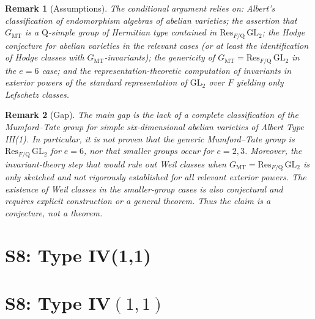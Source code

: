 \documentclass{article}
\newcommand{\mathbb}[1]{\mathrm{#1}}
\newtheorem{remark}{Remark}
\begin{document}
\begin{remark}[Assumptions]
The conditional argument relies on: Albert's classification of endomorphism algebras of abelian varieties; the assertion that $G_{\mathrm{MT}}$ is a $\mathbb{Q}$-simple group of Hermitian type contained in $\mathrm{Res}_{F/\mathbb{Q}}\,\mathrm{GL}_2$; the Hodge conjecture for abelian varieties in the relevant cases (or at least the identification of Hodge classes with $G_{\mathrm{MT}}$-invariants); the genericity of $G_{\mathrm{MT}} = \mathrm{Res}_{F/\mathbb{Q}}\,\mathrm{GL}_2$ in the $e = 6$ case; and the representation-theoretic computation of invariants in exterior powers of the standard representation of $\mathrm{GL}_2$ over $F$ yielding only Lefschetz classes.
\end{remark}

\begin{remark}[Gap]
The main gap is the lack of a complete classification of the Mumford--Tate group for simple six-dimensional abelian varieties of Albert Type III(1). In particular, it is not proven that the generic Mumford--Tate group is $\mathrm{Res}_{F/\mathbb{Q}}\,\mathrm{GL}_2$ for $e = 6$, nor that smaller groups occur for $e = 2,3$. Moreover, the invariant-theory step that would rule out Weil classes when $G_{\mathrm{MT}} = \mathrm{Res}_{F/\mathbb{Q}}\,\mathrm{GL}_2$ is only sketched and not rigorously established for all relevant exterior powers. The existence of Weil classes in the smaller-group cases is also conjectural and requires explicit construction or a general theorem. Thus the claim is a conjecture, not a theorem.
\end{remark}

\section{S8: Type IV(1,1)}
\section*{S8: Type IV$(1,1)$}
\end{document}
